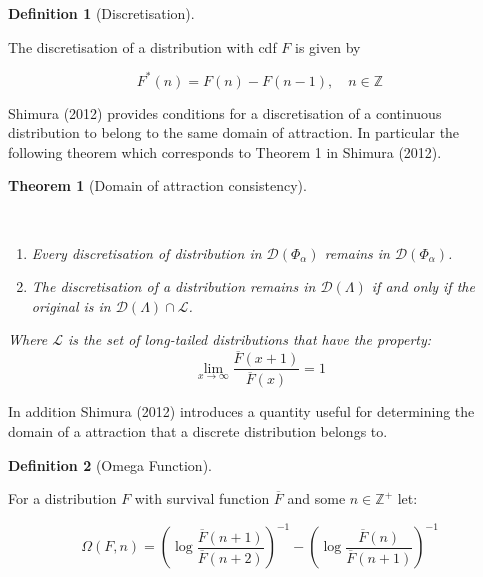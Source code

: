 \documentclass[
  10pt,
  a4paper,
]{scrreprt}
\providecommand{\tightlist}{%
  \setlength{\itemsep}{0pt}\setlength{\parskip}{0pt}}\usepackage{longtable,booktabs,array}
\theoremstyle{plain}
\newtheorem{theorem}{Theorem}[section]
\theoremstyle{definition}
\newtheorem{definition}{Definition}[section]
\theoremstyle{remark}
\begin{document}
{\begin{definition}[Discretisation]\protect\hypertarget{def-disc}{}\label{def-disc}

The discretisation of a distribution with cdf \(F\) is given by

\[F^*(n) = F(n) - F(n-1), \quad n   \in \mathbb Z\]

\end{definition}

Shimura (2012) provides conditions for a discretisation of a continuous
distribution to belong to the same domain of attraction. In particular
the following theorem which corresponds to Theorem 1 in Shimura (2012).

\begin{theorem}[Domain of attraction
consistency]\protect\hypertarget{thm-shimura1}{}\label{thm-shimura1}

~

\begin{enumerate}
\def\labelenumi{(\alph{enumi})}
\tightlist
\item
  Every discretisation of distribution in \(\mathcal D(\Phi_\alpha)\)
  remains in \(\mathcal D(\Phi_\alpha)\).
\item
  The discretisation of a distribution remains in
  \(\mathcal D(\Lambda)\) if and only if the original is in
  \(\mathcal D(\Lambda)\cap \mathcal L\).
\end{enumerate}

Where \(\mathcal L\) is the set of long-tailed distributions that have
the property: \[
\lim_{x\rightarrow \infty}\displaystyle\frac{\overline F(x+1)}{\overline F(x)} = 1   
\]

\end{theorem}

In addition Shimura (2012) introduces a quantity useful for determining
the domain of a attraction that a discrete distribution belongs to.

\begin{definition}[Omega
Function]\protect\hypertarget{def-omega}{}\label{def-omega}

For a distribution \(F\) with survival function \(\overline F\) and some
\(n\in\mathbb Z^+\) let:

\[
\Omega(F,n) = \left(\log\displaystyle\frac{\overline F (n+1)}{\overline F (n+2)}\right)^{-1} - \left(\log\displaystyle\frac{\overline F (n)}{\overline F (n+1)}\right)^{-1}
\]

\end{definition}

}
\end{document}
